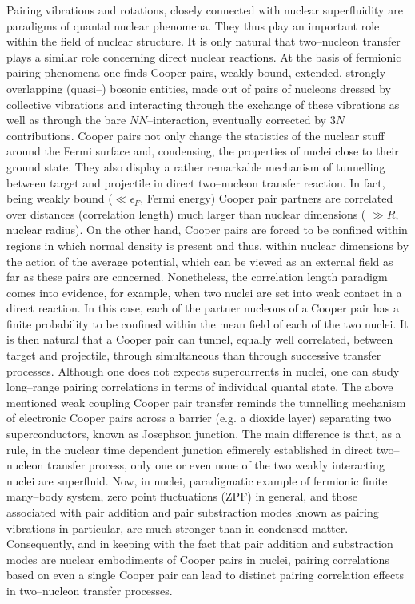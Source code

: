 Pairing vibrations and rotations, closely connected with nuclear superfluidity are  paradigms of quantal nuclear phenomena. They thus play an important  role within the field of nuclear structure. It is only natural that two--nucleon transfer plays a similar role concerning direct nuclear reactions. 
At the basis of fermionic pairing phenomena one finds Cooper pairs, weakly bound, extended, strongly overlapping (quasi--) bosonic entities, made out of pairs of nucleons dressed by collective vibrations and interacting through the exchange of these vibrations as well as through the bare $NN$--interaction, eventually corrected by $3N$ contributions.
Cooper pairs not only change the statistics of the nuclear stuff around the Fermi surface and, condensing, the properties of nuclei close to their ground state. They also display a rather remarkable mechanism of tunnelling between  target and projectile in  direct two--nucleon transfer reaction. In fact, being weakly bound ($\ll \epsilon_F$, Fermi energy) Cooper pair partners are correlated over distances (correlation length) much larger than nuclear dimensions ( $\gg R$, nuclear radius). On the other hand, Cooper pairs are forced to be confined within regions in which normal density is present and thus, within nuclear dimensions  by the action of the average potential, which can be viewed as an external field as far as these pairs are concerned. Nonetheless, the
correlation length paradigm comes into evidence, for example, when two nuclei are set into weak contact in a direct reaction. In this case, each of the partner nucleons of a Cooper pair has a finite probability to be confined within the mean field of each of the two nuclei. It is then natural that a Cooper pair can tunnel, equally well correlated, between target and projectile, through simultaneous than through successive transfer processes. Although one does not expects supercurrents in nuclei, one can study long--range pairing correlations in terms of individual quantal state. The above mentioned weak coupling Cooper pair transfer reminds  the tunnelling mechanism of electronic Cooper pairs across a barrier (e.g. a dioxide layer) separating two superconductors, known as Josephson junction. The main difference is that, as a rule, in the nuclear time dependent junction efimerely established in  direct two--nucleon transfer process, only one or even none of the two weakly interacting nuclei are superfluid. Now, in nuclei, paradigmatic example of fermionic  finite many--body system, zero point fluctuations  (ZPF) in general, and those associated with pair addition and pair substraction modes known as pairing vibrations in particular, are much stronger than in condensed matter. Consequently, and in keeping with the fact that pair addition and substraction modes are  nuclear embodiments of Cooper pairs in nuclei,   pairing correlations based on even  a single Cooper pair can lead to distinct pairing correlation effects in two--nucleon transfer processes. 


